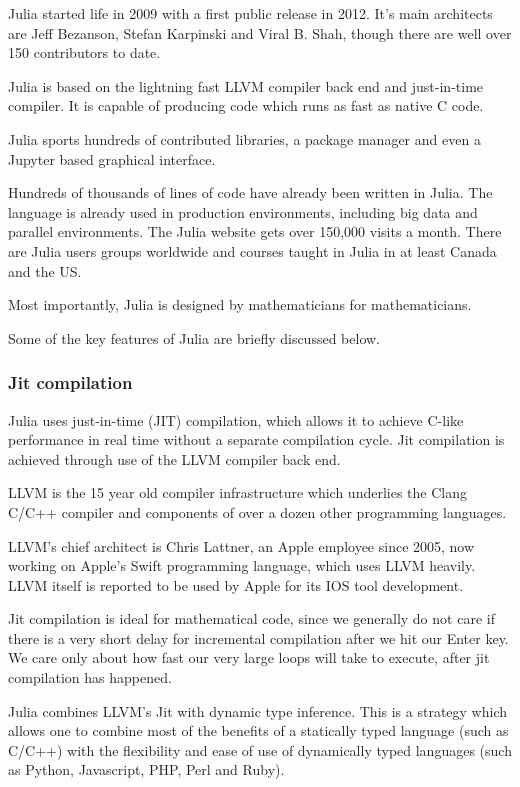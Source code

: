 \documentclass[a4paper,10pt]{article}
\begin{document}
Julia started life in 2009 with a first public release in 2012. It's main architects are Jeff Bezanson,
Stefan Karpinski and Viral B. Shah, though there are well over 150 contributors to date.

Julia is based on the lightning fast LLVM compiler back end and just-in-time compiler. It is capable of
producing code which runs as fast as native C code.

Julia sports hundreds of contributed libraries, a package manager and even a Jupyter based graphical
interface.

Hundreds of thousands of lines of code have already been written in Julia. The language is
already used in production environments, including big data and parallel environments. The
Julia website gets over 150,000 visits a month. There are Julia users groups worldwide and
courses taught in Julia in at least Canada and the US.

Most importantly, Julia is designed by mathematicians for mathematicians.

Some of the key features of Julia are briefly discussed below.

\subsubsection{Jit compilation}

Julia uses just-in-time (JIT) compilation, which allows it to achieve C-like performance in real time
without a separate compilation cycle. Jit compilation is achieved through use of the LLVM compiler
back end.

LLVM is the 15 year old compiler infrastructure which underlies the Clang C/C++ compiler and components
of over a dozen other programming languages.

LLVM's chief architect is Chris Lattner, an Apple employee since 2005, now working on Apple's 
Swift programming language, which uses LLVM heavily. LLVM itself is reported to be used by Apple
for its IOS tool development. 

Jit compilation is ideal for mathematical code, since we generally do not care if there is a very short
delay for incremental compilation after we hit our Enter key. We care only about how fast our very large
loops will take to execute, after jit compilation has happened.

Julia combines LLVM's Jit with dynamic type inference. This is a strategy which allows one to
combine most of the benefits of a statically typed language (such as C/C++) with the flexibility
and ease of use of dynamically typed languages (such as Python, Javascript, PHP, Perl and 
Ruby).
\end{document}
